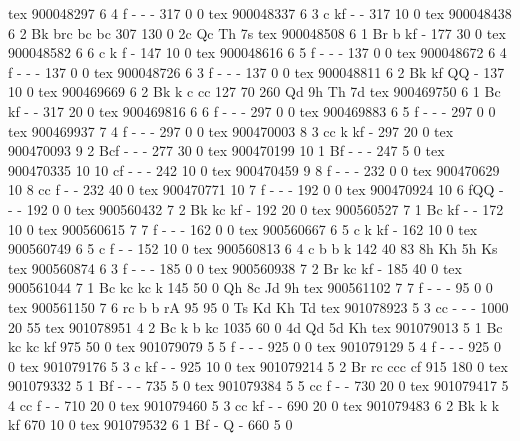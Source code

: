 tex       900048297  6  4 f   -     -     -          317    0    0 
tex       900048337  6  3 c   kf    -     -          317   10    0 
tex       900048438  6  2 Bk  brc   bc    bc         307  130    0 2c Qc Th 7s
tex       900048508  6  1 Br  b     kf    -          177   30    0 
tex       900048582  6  6 c   k     f     -          147   10    0 
tex       900048616  6  5 f   -     -     -          137    0    0 
tex       900048672  6  4 f   -     -     -          137    0    0 
tex       900048726  6  3 f   -     -     -          137    0    0 
tex       900048811  6  2 Bk  kf    QQ    -          137   10    0 
tex       900469669  6  2 Bk  k     c     cc         127   70  260 Qd 9h Th 7d
tex       900469750  6  1 Bc  kf    -     -          317   20    0 
tex       900469816  6  6 f   -     -     -          297    0    0 
tex       900469883  6  5 f   -     -     -          297    0    0 
tex       900469937  7  4 f   -     -     -          297    0    0 
tex       900470003  8  3 cc  k     kf    -          297   20    0 
tex       900470093  9  2 Bcf -     -     -          277   30    0 
tex       900470199 10  1 Bf  -     -     -          247    5    0 
tex       900470335 10 10 cf  -     -     -          242   10    0 
tex       900470459  9  8 f   -     -     -          232    0    0 
tex       900470629 10  8 cc  f     -     -          232   40    0 
tex       900470771 10  7 f   -     -     -          192    0    0 
tex       900470924 10  6 fQQ -     -     -          192    0    0 
tex       900560432  7  2 Bk  kc    kf    -          192   20    0 
tex       900560527  7  1 Bc  kf    -     -          172   10    0 
tex       900560615  7  7 f   -     -     -          162    0    0 
tex       900560667  6  5 c   k     kf    -          162   10    0 
tex       900560749  6  5 c   f     -     -          152   10    0 
tex       900560813  6  4 c   b     b     k          142   40   83 8h Kh 5h Ks
tex       900560874  6  3 f   -     -     -          185    0    0 
tex       900560938  7  2 Br  kc    kf    -          185   40    0 
tex       900561044  7  1 Bc  kc    kc    k          145   50    0 Qh 8c Jd 9h
tex       900561102  7  7 f   -     -     -           95    0    0 
tex       900561150  7  6 rc  b     b     rA          95   95    0 Ts Kd Kh Td
tex       901078923  5  3 cc  -     -     -         1000   20   55 
tex       901078951  4  2 Bc  k     b     kc        1035   60    0 4d Qd 5d Kh
tex       901079013  5  1 Bc  kc    kc    kf         975   50    0 
tex       901079079  5  5 f   -     -     -          925    0    0 
tex       901079129  5  4 f   -     -     -          925    0    0 
tex       901079176  5  3 c   kf    -     -          925   10    0 
tex       901079214  5  2 Br  rc    ccc   cf         915  180    0 
tex       901079332  5  1 Bf  -     -     -          735    5    0 
tex       901079384  5  5 cc  f     -     -          730   20    0 
tex       901079417  5  4 cc  f     -     -          710   20    0 
tex       901079460  5  3 cc  kf    -     -          690   20    0 
tex       901079483  6  2 Bk  k     k     kf         670   10    0 
tex       901079532  6  1 Bf  -     Q     -          660    5    0 
